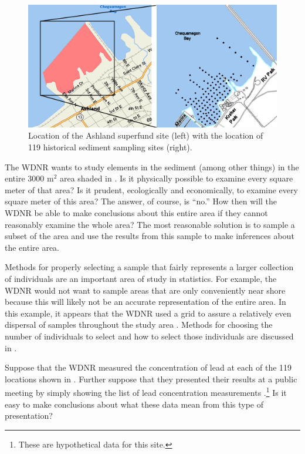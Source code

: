 \documentclass[10pt,openany]{book}\usepackage[]{graphicx}\usepackage[]{color}
\begin{document}
\begin{figure}[htbp]
  \centering
    \includegraphics[width=6in]{Figs/Kreher_Park_Map.png}
  \caption{Location of the Ashland superfund site (left) with the location of 119 historical sediment sampling sites (right).}
  \label{fig:KreherParkMap}
\end{figure}

The WDNR wants to study elements in the sediment (among other things) in the entire 3000 m$^2$ area shaded in . Is it physically possible to examine every square meter of that area?  Is it prudent, ecologically and economically, to examine every square meter of this area?  The answer, of course, is ``no.''  How then will the WDNR be able to make conclusions about this entire area if they cannot reasonably examine the whole area?  The most reasonable solution is to sample a subset of the area and use the results from this sample to make inferences about the entire area.

Methods for properly selecting a sample that fairly represents a larger collection of individuals are an important area of study in statistics. For example, the WDNR would not want to sample areas that are only conveniently near shore because this will likely not be an accurate representation of the entire area. In this example, it appears that the WDNR used a grid to assure a relatively even dispersal of samples throughout the study area . Methods for choosing the number of individuals to select and how to select those individuals are discussed in .


Suppose that the WDNR measured the concentration of lead at each of the 119 locations shown in . Further suppose that they presented their results at a public meeting by simply showing the list of lead concentration measurements .\footnote{These are hypothetical data for this site.}  Is it easy to make conclusions about what these data mean from this type of presentation?
\end{document}
